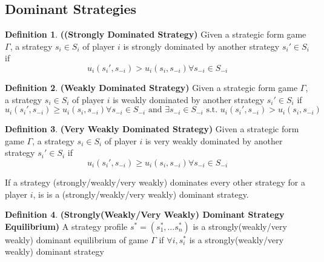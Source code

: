 \documentclass{article}
\theoremstyle{definition}
\newtheorem{defn}{Definition}[section]
\begin{document}
\subsection{Dominant Strategies}
\begin{defn}
\textbf{((Strongly Dominated Strategy)} Given a strategic form game $\Gamma$, a strategy $s_i\in S_i$ of player $i$ is strongly dominated by another strategy $s_i'\in S_i$ if $$u_i(s_i',s_{-i})>u_i(s_i,s_{-i}) \forall s_{-i}\in S_{-i}$$
\end{defn}
\begin{defn}
\textbf{(Weakly Dominated Strategy)} Given a strategic form game $\Gamma$, a strategy $s_i\in S_i$ of player $i$ is weakly dominated by another strategy $s_i'\in S_i$ if $$u_i(s_i',s_{-i})\geq u_i(s_i,s_{-i}) \forall s_{-i}\in S_{-i} \text{ and } \exists s_{-i}\in S_{-i} \text{ s.t. } u_i(s_i',s_{-i})> u_i(s_i,s_{-i}) $$
\end{defn}
\begin{defn}
\textbf{(Very Weakly Dominated Strategy)} Given a strategic form game $\Gamma$, a strategy $s_i\in S_i$ of player $i$ is very weakly dominated by another strategy $s_i'\in S_i$ if $$u_i(s_i',s_{-i})\geq u_i(s_i,s_{-i}) \forall s_{-i}\in S_{-i}$$
\end{defn}
If a strategy (strongly/weakly/very weakly) dominates every other strategy for a player $i$, is is a (strongly/weakly/very weakly) dominant strategy.
\begin{defn}
\textbf{(Strongly(Weakly/Very Weakly) Dominant Strategy Equilibrium)} A strategy profile $s^* = (s_1^*,\dots s_n^*)$ is a strongly(weakly/very weakly) dominant equilibrium of game $\Gamma$ if $\forall i, s_i^*$ is a strongly(weakly/very weakly) dominant strategy  
\end{defn}
\end{document}
